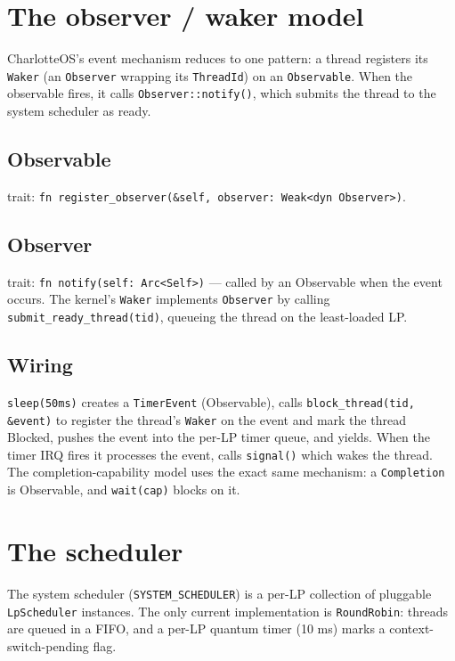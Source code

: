 \section{The observer / waker model}

CharlotteOS's event mechanism reduces to one pattern: a thread registers its
\texttt{Waker} (an \texttt{Observer} wrapping its \texttt{ThreadId}) on an
\texttt{Observable}. When the observable fires, it calls
\texttt{Observer::notify()}, which submits the thread to the system scheduler
as ready.

\subsection{Observable} trait: \texttt{fn register\_observer(\&self, observer:
Weak<dyn Observer>)}.

\subsection{Observer} trait: \texttt{fn notify(self: Arc<Self>)} --- called by
an Observable when the event occurs. The kernel's \texttt{Waker} implements
\texttt{Observer} by calling \texttt{submit\_ready\_thread(tid)}, queueing the
thread on the least-loaded LP.

\subsection{Wiring} \texttt{sleep(50ms)} creates a \texttt{TimerEvent}
(Observable), calls \texttt{block\_thread(tid, \&event)} to register the
thread's \texttt{Waker} on the event and mark the thread Blocked, pushes the
event into the per-LP timer queue, and yields. When the timer IRQ fires it
processes the event, calls \texttt{signal()} which wakes the thread. The
completion-capability model uses the exact same mechanism: a
\texttt{Completion} is Observable, and \texttt{wait(cap)} blocks on it.

\section{The scheduler}

The system scheduler (\texttt{SYSTEM\_SCHEDULER}) is a per-LP collection of
pluggable \texttt{LpScheduler} instances. The only current implementation is
\texttt{RoundRobin}: threads are queued in a FIFO, and a per-LP quantum timer
(10 ms) marks a context-switch-pending flag.

